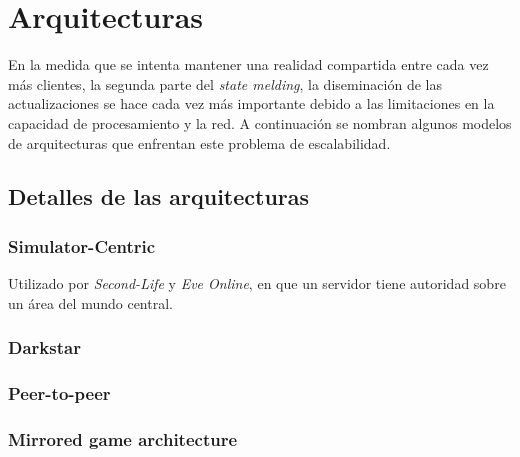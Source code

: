 \section{Arquitecturas}

En la medida que se intenta mantener una realidad compartida entre cada vez más clientes, la segunda parte del \emph{state melding}, la diseminación de las actualizaciones se hace cada vez más importante debido a las limitaciones en la capacidad de procesamiento y la red. A continuación se nombran algunos modelos de arquitecturas que enfrentan este problema de escalabilidad.

\subsection{Detalles de las arquitecturas}

\subsubsection{Simulator-Centric}

Utilizado por \emph{Second-Life} y \emph{Eve Online}, en que un servidor tiene autoridad sobre un área del mundo central.

\subsubsection{Darkstar}

\subsubsection{Peer-to-peer}

\subsubsection{Mirrored game architecture}

